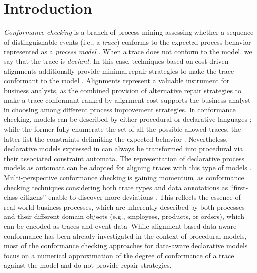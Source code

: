 \section{Introduction}
\label{sec:introduction}

\textit{Conformance checking} is a branch of process mining  assessing whether a sequence of distinguishable events (i.e., a \textit{trace}) conforms to the expected process behavior represented as a \textit{process model} \cite{RozinatA08}. When a trace does not conform to the model, we say that the trace is \textit{deviant}. In this case, techniques based on cost-driven alignments additionally provide minimal repair strategies to make the trace conformant to the model \cite{LeoniA13}. Alignments represent a valuable instrument for business analysts, as the combined provision of alternative repair strategies to make a trace conformant ranked by alignment cost supports the business analyst in choosing among different process improvement strategies. In conformance checking, models can be described by either procedural  or declarative languages  ;  while the former fully enumerate the set of all the possible allowed traces, the latter %
list the constraints delimiting the expected behavior \cite{LeoniA13,Westergaard11}. Nevertheless, %
declarative models expressed in  can always be transformed into procedural via their associated constraint automata. 
%
The representation of declarative process models as automata can be adopted for aligning traces with this type of models \cite{LeoniMA12,XuLZ17a}.
\\
\indent
Multi-perspective conformance checking is gaining momentum, as conformance checking techniques considering both trace types and data annotations as ``first-class citizens'' enable to discover more deviations \cite{MultiPerspective}. This reflects the essence of real-world business processes, which are inherently described by both processes and their different domain objects \cite{PetermannJMR14} (e.g., employees, products, or orders), which can be encoded as traces and event data. While alignment-based  data-aware conformance has been already investigated in the context of procedural models, most of the conformance checking approaches for data-aware declarative models \cite{BurattinMS16,Borrego014} focus on a numerical approximation of the degree of conformance of a trace against the model and do not provide repair strategies.
